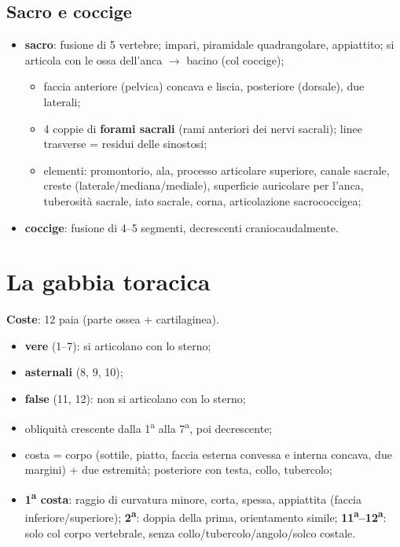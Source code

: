 \subsection{Sacro e coccige}
\begin{itemize}
  \item \textbf{sacro}: fusione di 5 vertebre; impari, piramidale quadrangolare, appiattito;
    si articola con le ossa dell'anca $\rightarrow$ bacino (col coccige);
    \begin{itemize}
      \item faccia anteriore (pelvica) concava e liscia, posteriore (dorsale), due laterali;
      \item 4 coppie di \textbf{forami sacrali} (rami anteriori dei nervi sacrali); linee trasverse
        = residui delle sinostosi;
      \item elementi: promontorio, ala, processo articolare superiore, canale sacrale, creste
        (laterale/mediana/mediale), superficie auricolare per l'anca, tuberosità sacrale, iato
        sacrale, corna, articolazione sacrococcigea;
    \end{itemize}
  \item \textbf{coccige}: fusione di 4--5 segmenti, decrescenti craniocaudalmente.
\end{itemize}

\section{La gabbia toracica}

\textbf{Coste}: 12 paia (parte ossea + cartilaginea).
\begin{itemize}
  \item \textbf{vere} (1--7): si articolano con lo sterno;
  \item \textbf{asternali} (8, 9, 10);
  \item \textbf{false} (11, 12): non si articolano con lo sterno;
  \item obliquità crescente dalla 1\textsuperscript{a} alla 7\textsuperscript{a}, poi decrescente;
  \item costa = corpo (sottile, piatto, faccia esterna convessa e interna concava, due margini) +
    due estremità; posteriore con testa, collo, tubercolo;
  \item \textbf{1\textsuperscript{a} costa}: raggio di curvatura minore, corta, spessa, appiattita
    (faccia inferiore/superiore); \textbf{2\textsuperscript{a}}: doppia della prima, orientamento
    simile; \textbf{11\textsuperscript{a}--12\textsuperscript{a}}: solo col corpo vertebrale, senza
    collo/tubercolo/angolo/solco costale.
\end{itemize}

